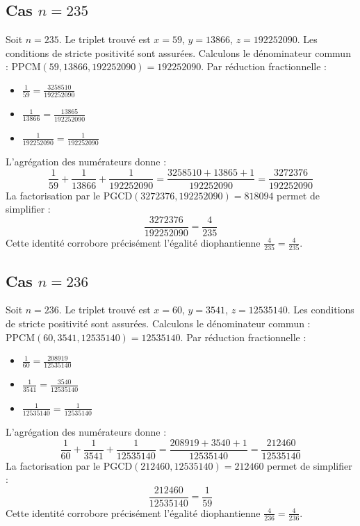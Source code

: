 \documentclass[11pt,a4paper]{article}
\begin{document}
\subsection{Cas $n = 235$}
Soit $n = 235$. Le triplet trouvé est $x = 59$, $y = 13866$, $z = 192252090$.
Les conditions de stricte positivité sont assurées.
Calculons le dénominateur commun : $\text{PPCM}(59, 13866, 192252090) = 192252090$.
Par réduction fractionnelle :
\begin{itemize}
    \item $\frac{1}{59} = \frac{3258510}{192252090}$
    \item $\frac{1}{13866} = \frac{13865}{192252090}$
    \item $\frac{1}{192252090} = \frac{1}{192252090}$
\end{itemize}
L'agrégation des numérateurs donne :
$$ \frac{1}{59} + \frac{1}{13866} + \frac{1}{192252090} = \frac{3258510 + 13865 + 1}{192252090} = \frac{3272376}{192252090} $$
La factorisation par le $\text{PGCD}(3272376, 192252090) = 818094$ permet de simplifier :
$$ \frac{3272376}{192252090} = \frac{4}{235} $$
Cette identité corrobore précisément l'égalité diophantienne $\frac{4}{235} = \frac{4}{235}$.

\subsection{Cas $n = 236$}
Soit $n = 236$. Le triplet trouvé est $x = 60$, $y = 3541$, $z = 12535140$.
Les conditions de stricte positivité sont assurées.
Calculons le dénominateur commun : $\text{PPCM}(60, 3541, 12535140) = 12535140$.
Par réduction fractionnelle :
\begin{itemize}
    \item $\frac{1}{60} = \frac{208919}{12535140}$
    \item $\frac{1}{3541} = \frac{3540}{12535140}$
    \item $\frac{1}{12535140} = \frac{1}{12535140}$
\end{itemize}
L'agrégation des numérateurs donne :
$$ \frac{1}{60} + \frac{1}{3541} + \frac{1}{12535140} = \frac{208919 + 3540 + 1}{12535140} = \frac{212460}{12535140} $$
La factorisation par le $\text{PGCD}(212460, 12535140) = 212460$ permet de simplifier :
$$ \frac{212460}{12535140} = \frac{1}{59} $$
Cette identité corrobore précisément l'égalité diophantienne $\frac{4}{236} = \frac{4}{236}$.
\end{document}
